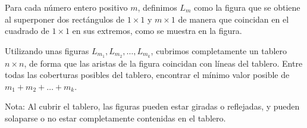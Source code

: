 Para cada número entero positivo $m$, definimos $L_m$ como la figura que se obtiene al superponer dos rectángulos de $1 \times 1$ y $m\times 1$ de manera que coincidan en el cuadrado de $1 \times 1$ en sus extremos, como se muestra en la figura.

Utilizando unas figuras $L_{m_1}, L_{m_2}, \dots, L_{m_k}$, cubrimos completamente un tablero $n \times n$, de forma que las aristas de la figura coincidan con líneas del tablero. Entre todas las coberturas posibles del tablero, encontrar el mínimo valor posible de $m_1 + m_2 + \dots + m_k$.

Nota: Al cubrir el tablero, las figuras pueden estar giradas o reflejadas, y pueden solaparse o no estar completamente contenidas en el tablero.
